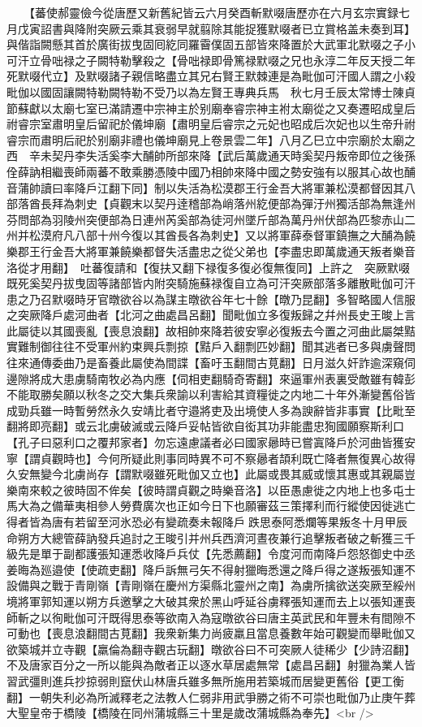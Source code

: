 　　【蕃使郝靈儉今從唐歷又新舊紀皆云六月癸酉斬默啜唐歷亦在六月玄宗實録七月戊寅詔書與降附突厥云乘其衰弱早就翦除其能捉獲默啜者已立賞格盖未奏到耳】與偕詣闕懸其首於廣街拔曳固囘紇同羅霫僕固五部皆來降置於大武軍北默啜之子小可汗立骨咄禄之子闕特勒擊殺之【骨咄禄即骨篤禄默啜之兄也永淳二年反天授二年死默啜代立】及默啜諸子親信略盡立其兄右賢王默棘連是為毗伽可汗國人謂之小殺毗伽以國固讓闕特勒闕特勒不受乃以為左賢王專典兵馬　秋七月壬辰太常博士陳貞節蘇獻以太廟七室已滿請遷中宗神主於别廟奉睿宗神主袝太廟從之又奏遷昭成皇后祔睿宗室肅明皇后留祀於儀坤廟【肅明皇后睿宗之元妃也昭成后次妃也以生帝升祔睿宗而肅明后祀於别廟非禮也儀坤廟見上卷景雲二年】八月乙巳立中宗廟於太廟之西　辛未契丹李失活奚李大酺帥所部來降【武后萬歲通天時奚契丹叛帝即位之後孫佺薛訥相繼喪師兩蕃不敢乘勝憑陵中國乃相帥來降中國之勢安強有以服其心故也酺音蒲帥讀曰率降戶江翻下同】制以失活為松漠郡王行金吾大將軍兼松漠都督因其八部落酋長拜為刺史【貞觀末以契丹逹稽部為峭落州紇便部為彈汙州獨活部為無逢州芬問部為羽陵州突便部為日連州芮奚部為徒河州墜斤部為萬丹州伏部為匹黎赤山二州并松漠府凡八部十州今復以其酋長各為刺史】又以將軍薛泰督軍鎮撫之大酺為饒樂郡王行金吾大將軍兼饒樂都督失活盡忠之從父弟也【李盡忠即萬歲通天叛者樂音洛從才用翻】　吐蕃復請和【復扶又翻下禄復多復必復無復同】上許之　突厥默啜既死奚契丹拔曳固等諸部皆内附突騎施蘇禄復自立為可汗突厥部落多離散毗伽可汗患之乃召默啜時牙官暾欲谷以為謀主暾欲谷年七十餘【暾乃昆翻】多智略國人信服之突厥降戶處河曲者【北河之曲處昌呂翻】聞毗伽立多復叛歸之幷州長史王晙上言此屬徒以其國喪亂【喪息浪翻】故相帥來降若彼安寧必復叛去今置之河曲此屬桀黠實難制御往往不受軍州約束興兵剽掠【黠戶入翻剽匹妙翻】聞其逃者已多與虜聲問往來通傳委曲乃是畜養此屬使為間諜【畜吁玉翻間古莧翻】日月滋久奸詐逾深窺伺邊隙將成大患虜騎南牧必為内應【伺相吏翻騎奇寄翻】來逼軍州表裏受敵雖有韓彭不能取勝矣願以秋冬之交大集兵衆諭以利害給其資糧徙之内地二十年外漸變舊俗皆成勁兵雖一時暫勞然永久安靖比者守邉將吏及出境使人多為諛辭皆非事實【比毗至翻將即亮翻】或云北虜破滅或云降戶妥帖皆欲自衒其功非能盡忠狥國願察斯利口【孔子曰惡利口之覆邦家者】勿忘遠慮議者必曰國家曏時已嘗寘降戶於河曲皆獲安寧【謂貞觀時也】今何所疑此則事同時異不可不察曏者頡利既亡降者無復異心故得久安無變今北虜尚存【謂默啜雖死毗伽又立也】此屬或畏其威或懷其惠或其親屬豈樂南來較之彼時固不侔矣【彼時謂貞觀之時樂音洛】以臣愚慮徙之内地上也多屯士馬大為之備華夷相參人勞費廣次也正如今日下也願審茲三策擇利而行縱使因徙逃亡得者皆為唐有若留至河氷恐必有變疏奏未報降戶跌思泰阿悉爛等果叛冬十月甲辰命朔方大總管薛訥發兵追討之王晙引并州兵西濟河晝夜兼行追擊叛者破之斬獲三千級先是單于副都護張知運悉收降戶兵仗【先悉薦翻】令度河而南降戶怨怒御史中丞姜晦為廵邉使【使疏吏翻】降戶訴無弓矢不得射獵晦悉還之降戶得之遂叛張知運不設備與之戰于青剛嶺【青剛嶺在慶州方渠縣北靈州之南】為虜所擒欲送突厥至綏州境將軍郭知運以朔方兵邀擊之大破其衆於黑山呼延谷虜釋張知運而去上以張知運喪師斬之以徇毗伽可汗既得思泰等欲南入為寇暾欲谷曰唐主英武民和年豐未有間隙不可動也【喪息浪翻間古莧翻】我衆新集力尚疲羸且當息養數年始可觀變而舉毗伽又欲築城并立寺觀【羸倫為翻寺觀古玩翻】暾欲谷曰不可突厥人徒稀少【少詩沼翻】不及唐家百分之一所以能與為敵者正以逐水草居處無常【處昌呂翻】射獵為業人皆習武彊則進兵抄掠弱則竄伏山林唐兵雖多無所施用若築城而居變更舊俗【更工衡翻】一朝失利必為所滅釋老之法教人仁弱非用武爭勝之術不可崇也毗伽乃止庚午葬大聖皇帝于橋陵【橋陵在同州蒲城縣三十里是歲改蒲城縣為奉先】<br />
